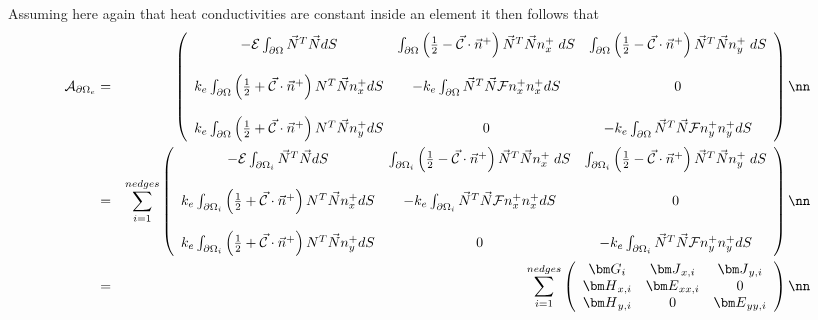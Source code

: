 Assuming here again that heat conductivities are constant inside an element
it then follows that 
\begin{eqnarray}
 {\cal A}_{\partial\Omega_e}
&=&
\left(
\begin{array}{ccc}
-  {\cal{E}} \int_{\partial\Omega}     \vec{N}^T \vec{N} dS   & 
\int_{\partial\Omega}  \left(\frac{1}{2} - \vec{\cal{C}} \cdot \vec{n}^+ \right) \vec{N}^T \vec{N} n^+_x  \; dS &
  \int_{\partial\Omega}  \left(\frac{1}{2} - \vec{\cal{C}} \cdot \vec{n}^+ \right) \vec{N}^T \vec{N} n^+_y  \; dS \\ \\
k_e \int_{\partial\Omega}  \left( \frac{1}{2} + \vec{\cal C} \cdot \vec{n}^+ \right) {N}^T \vec{N} n^+_x dS & 
-k_e\int_{\partial\Omega}  \vec{N}^T\vec{N}  {\cal F} {n}^+_x   n^+_x dS  
& 0 \\ \\
k_e \int_{\partial\Omega}  \left( \frac{1}{2} + \vec{\cal C} \cdot \vec{n}^+ \right) {N}^T \vec{N} n^+_y dS & 
0
& -k_e \int_{\partial\Omega}  \vec{N}^T\vec{N}  {\cal F} {n}^+_y   n^+_y dS    
\end{array}
\right)
\nn\\
&=&
\sum_{i=1}^{nedges}
\left(
\begin{array}{ccc}
-  {\cal{E}} \int_{\partial\Omega_i}     \vec{N}^T \vec{N} dS   & 
\int_{\partial\Omega_i}  \left(\frac{1}{2} - \vec{\cal{C}} \cdot \vec{n}^+ \right) \vec{N}^T \vec{N} n^+_x  \; dS &
  \int_{\partial\Omega_i}  \left(\frac{1}{2} - \vec{\cal{C}} \cdot \vec{n}^+ \right) \vec{N}^T \vec{N} n^+_y  \; dS \\ \\
k_e \int_{\partial\Omega_i}  \left( \frac{1}{2} + \vec{\cal C} \cdot \vec{n}^+ \right) {N}^T \vec{N} n^+_x dS & 
-k_e\int_{\partial\Omega_i}  \vec{N}^T\vec{N}  {\cal F} {n}^+_x   n^+_x dS  
& 0 \\ \\
k_e \int_{\partial\Omega_i}  \left( \frac{1}{2} + \vec{\cal C} \cdot \vec{n}^+ \right) {N}^T \vec{N} n^+_y dS & 
0
& -k_e \int_{\partial\Omega_i}  \vec{N}^T\vec{N}  {\cal F} {n}^+_y   n^+_y dS    
\end{array}
\right) \nn\\
&=&
\sum_{i=1}^{nedges}
\left(
\begin{array}{ccc}
{\bm G}_i & {\bm J}_{x,i} & {\bm J}_{y,i} \\
{\bm H}_{x,i} & {\bm E}_{xx,i} & 0 \\ 
{\bm H}_{y,i} & 0 & {\bm E}_{yy,i} 
\end{array}
\right) \nn
\end{eqnarray}


